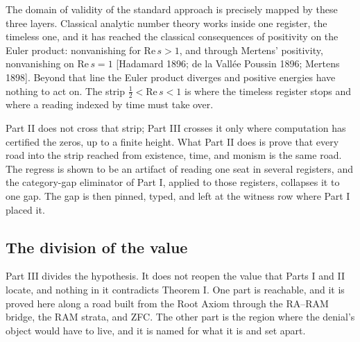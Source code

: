 \documentclass[10pt]{article}
\begin{document}
The domain of validity of the standard approach is precisely mapped by
these three layers. Classical analytic number theory works inside one
register, the timeless one, and it has reached the classical
consequences of positivity on the Euler product: nonvanishing for
\(\mathrm{Re}\, s > 1\), and through Mertens' positivity, nonvanishing
on \(\mathrm{Re}\, s = 1\) {[}Hadamard 1896; de la Vallée Poussin 1896;
Mertens 1898{]}. Beyond that line the Euler product diverges and
positive energies have nothing to act on. The strip
\(\tfrac12 < \mathrm{Re}\, s < 1\) is where the timeless register stops
and where a reading indexed by time must take over.

Part II does not cross that strip; Part III crosses it only where
computation has certified the zeros, up to a finite height. What Part II
does is prove that every road into the strip reached from existence,
time, and monism is the same road. The regress is shown to be an
artifact of reading one seat in several registers, and the category-gap
eliminator of Part I, applied to those registers, collapses it to one
gap. The gap is then pinned, typed, and left at the witness row where
Part I placed it.

\hypertarget{the-division-of-the-value}{%
\subsection{The division of the value}\label{the-division-of-the-value}}

Part III divides the hypothesis. It does not reopen the value that Parts
I and II locate, and nothing in it contradicts Theorem I. One part is
reachable, and it is proved here along a road built from the Root Axiom
through the RA--RAM bridge, the RAM strata, and ZFC. The other part is
the region where the denial's object would have to live, and it is named
for what it is and set apart.
\end{document}
